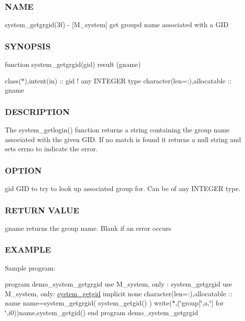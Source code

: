 \subsubsection*{N\+A\+ME}

system\+\_\+getgrgid(3f) -\/ \mbox{[}M\+\_\+system\mbox{]} get groupd name associated with a G\+ID \subsubsection*{S\+Y\+N\+O\+P\+S\+IS}

function system\+\_\+getgrgid(gid) result (gname)

class($\ast$),intent(in) \+:\+: gid ! any I\+N\+T\+E\+G\+ER type character(len=\+:),allocatable \+:\+: gname

\subsubsection*{D\+E\+S\+C\+R\+I\+P\+T\+I\+ON}

\begin{DoxyVerb}The system_getlogin() function returns a string containing the group
name associated with the given GID. If no match is found
it returns a null string and sets errno to indicate the error.
\end{DoxyVerb}


\subsubsection*{O\+P\+T\+I\+ON}

gid G\+ID to try to look up associated group for. Can be of any I\+N\+T\+E\+G\+ER type.

\subsubsection*{R\+E\+T\+U\+RN V\+A\+L\+UE}

gname returns the group name. Blank if an error occurs

\subsubsection*{E\+X\+A\+M\+P\+LE}

Sample program\+:

program demo\+\_\+system\+\_\+getgrgid use M\+\_\+system, only \+: system\+\_\+getgrgid use M\+\_\+system, only\+: \hyperlink{interfacem__system_1_1system__getgid}{system\+\_\+getgid} implicit none character(len=\+:),allocatable \+:\+: name name=system\+\_\+getgrgid( system\+\_\+getgid() ) write($\ast$,\textquotesingle{}(\char`\"{}group\mbox{[}\char`\"{},a,\char`\"{}\mbox{]} for \char`\"{},i0)\textquotesingle{})name,system\+\_\+getgid() end program demo\+\_\+system\+\_\+getgrgid

